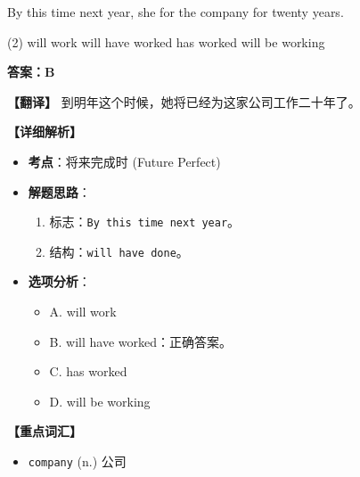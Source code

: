 \documentclass[11pt, a4paper]{article}
\newcommand{\analysis}[4]{
    \begin{solutionbox}
        \textbf{答案：#1}
        
        \textbf{【翻译】} #2
        
        \textbf{【详细解析】}
        #3
        
        \textbf{【重点词汇】}
        #4
    \end{solutionbox}
}
\newcommand{\blank}{\underline{\hspace{1.5cm}}}
\begin{document}
\begin{questions}
    \item By this time next year, she \blank for the company for twenty years.
    \begin{tasks}(2)
        \task will work \task will have worked
        \task has worked \task will be working
    \end{tasks}
    \analysis{B}{到明年这个时候，她将已经为这家公司工作二十年了。}{
        \begin{itemize}
            \item \textbf{考点}：将来完成时 (Future Perfect)
            \item \textbf{解题思路}：
                \begin{enumerate}
                    \item 标志：\texttt{By this time next year}。
                    \item 结构：\texttt{will have done}。
                \end{enumerate}
            \item \textbf{选项分析}：
                \begin{itemize}
                    \item A. will work
                    \item B. will have worked：正确答案。
                    \item C. has worked
                    \item D. will be working
                \end{itemize}
        \end{itemize}
    }{
        \begin{itemize}
            \item \texttt{company} (n.) 公司
        \end{itemize}
    }


\end{questions}
\end{document}
